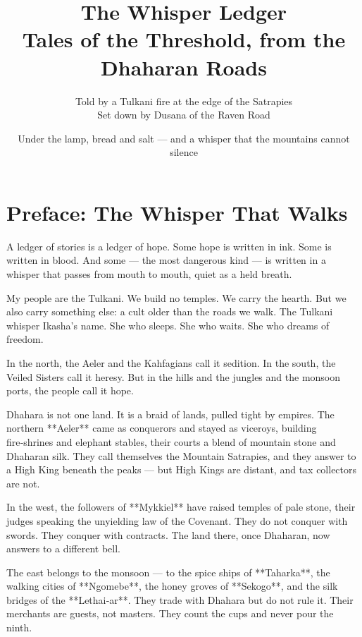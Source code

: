 \documentclass[10pt,twoside]{book}
\begin{document}
\title{\Huge\textbf{The Whisper Ledger}\\ \large Tales of the Threshold, from the Dhaharan Roads}
\author{Told by a Tulkani fire at the edge of the Satrapies\\ \small Set down by Dusana of the Raven Road}
\date{Under the lamp, bread and salt --- and a whisper that the mountains cannot silence}
\maketitle

\tableofcontents

\chapter*{Preface: The Whisper That Walks}

A ledger of stories is a ledger of hope. Some hope is written in ink. Some is written in blood. And some --- the most dangerous kind --- is written in a whisper that passes from mouth to mouth, quiet as a held breath.

My people are the Tulkani. We build no temples. We carry the hearth. But we also carry something else: a cult older than the roads we walk. The Tulkani whisper Ikasha's name. She who sleeps. She who waits. She who dreams of freedom.

In the north, the Aeler and the Kahfagians call it sedition. In the south, the Veiled Sisters call it heresy. But in the hills and the jungles and the monsoon ports, the people call it hope.

Dhahara is not one land. It is a braid of lands, pulled tight by empires. The northern **Aeler** came as conquerors and stayed as viceroys, building fire‑shrines and elephant stables, their courts a blend of mountain stone and Dhaharan silk. They call themselves the Mountain Satrapies, and they answer to a High King beneath the peaks --- but High Kings are distant, and tax collectors are not.

In the west, the followers of **Mykkiel** have raised temples of pale stone, their judges speaking the unyielding law of the Covenant. They do not conquer with swords. They conquer with contracts. The land there, once Dhaharan, now answers to a different bell.

The east belongs to the monsoon --- to the spice ships of **Taharka**, the walking cities of **Ngomebe**, the honey groves of **Sekogo**, and the silk bridges of the **Lethai‑ar**. They trade with Dhahara but do not rule it. Their merchants are guests, not masters. They count the cups and never pour the ninth.
\end{document}

